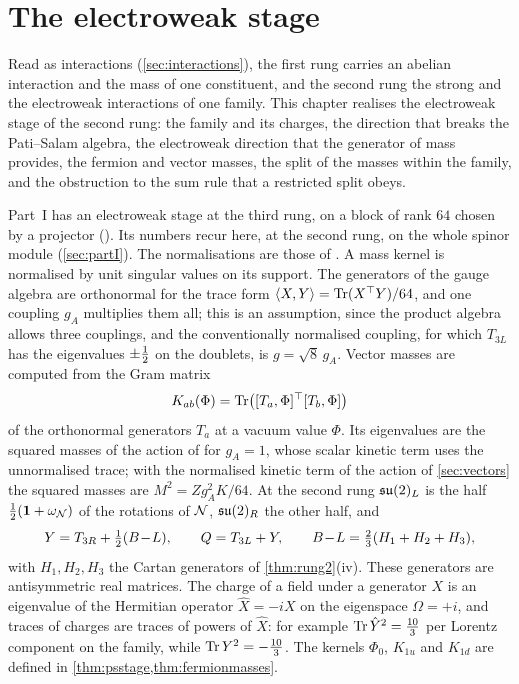 \chapter{The electroweak stage}
\label{ch:ew}

Read as interactions (\cref{sec:interactions}), the first rung carries an abelian interaction and the mass of one constituent, and the second
rung the strong and the electroweak interactions of one family. This chapter realises the electroweak stage of the second rung: the family
and its charges, the direction that breaks the Pati--Salam algebra, the electroweak direction that the generator of mass provides, the
fermion and vector masses, the split of the masses within the family, and the obstruction to the sum rule that a restricted split obeys.

Part~I has an electroweak stage at the third rung, on a block of rank $64$ chosen by a projector (). Its numbers recur
here, at the second rung, on the whole spinor module (\cref{sec:partI}). The normalisations are those of . A mass kernel is
normalised by unit singular values on its support. The generators of the gauge algebra are orthonormal for the trace form
$\langle X,Y\rangle=\operatorname{Tr}(X^\top Y)/64$, and one coupling $g_A$ multiplies them all; this is an assumption, since the product algebra allows
three couplings, and the conventionally normalised coupling, for which $T_{3L}$ has the eigenvalues $\pm\tfrac12$ on the doublets, is
$g=\sqrt8\,g_A$. Vector masses are computed from the Gram matrix
\begin{equation}
\label{eq:gram}
K_{ab}(\Phi)=\operatorname{Tr}\bigl([T_a,\Phi]^\top[T_b,\Phi]\bigr)
\end{equation}
of the orthonormal generators $T_a$ at a vacuum value $\Phi$. Its eigenvalues are the squared masses of the action of 
for $g_A=1$, whose scalar kinetic term uses the unnormalised trace; with the normalised kinetic term of the action of \cref{sec:vectors} the
squared masses are $M^2=Zg_A^2K/64$. At the second rung $\mathfrak{su}(2)_L$ is the half $\tfrac12(\mathbf 1+\omega_\mathcal N)$ of the rotations of $\mathcal N$, $\mathfrak{su}(2)_R$ the
other half, and
\[
Y=T_{3R}+\tfrac12(B\!-\!L),\qquad Q=T_{3L}+Y,\qquad B\!-\!L=\tfrac23(H_1+H_2+H_3),
\]
with $H_1,H_2,H_3$ the Cartan generators of \cref{thm:rung2}(iv). These generators are antisymmetric real matrices. The charge of a field
under a generator $X$ is an eigenvalue of the Hermitian operator $\hat X=-iX$ on the eigenspace $\Omega=+i$, and traces of charges are traces
of powers of $\hat X$: for example $\operatorname{Tr}\hat Y^2=\tfrac{10}3$ per Lorentz component on the family, while $\operatorname{Tr} Y^2=-\tfrac{10}3$. The kernels
$\Phi_0$, $K_{1u}$ and $K_{1d}$ are defined in \cref{thm:psstage,thm:fermionmasses}.

